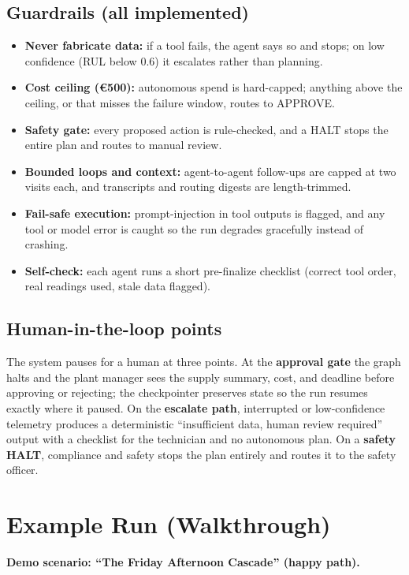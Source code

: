 \documentclass[11pt,a4paper]{article}
\let\oldsection\section
\renewcommand{\section}{\needspace{7\baselineskip}\oldsection}
\let\oldsubsection\subsection
\renewcommand{\subsection}{\needspace{5\baselineskip}\oldsubsection}
\begin{document}
\subsection*{Guardrails (all implemented)}
\begin{itemize}
  \item \textbf{Never fabricate data:} if a tool fails, the agent says so and stops; on low confidence (RUL below 0.6) it escalates rather than planning.
  \item \textbf{Cost ceiling (\euro{}500):} autonomous spend is hard-capped; anything above the ceiling, or that misses the failure window, routes to APPROVE.
  \item \textbf{Safety gate:} every proposed action is rule-checked, and a HALT stops the entire plan and routes to manual review.
  \item \textbf{Bounded loops and context:} agent-to-agent follow-ups are capped at two visits each, and transcripts and routing digests are length-trimmed.
  \item \textbf{Fail-safe execution:} prompt-injection in tool outputs is flagged, and any tool or model error is caught so the run degrades gracefully instead of crashing.
  \item \textbf{Self-check:} each agent runs a short pre-finalize checklist (correct tool order, real readings used, stale data flagged).
\end{itemize}

\subsection*{Human-in-the-loop points}
The system pauses for a human at three points. At the \textbf{approval gate} the graph halts and the plant manager sees the supply summary, cost, and deadline before approving or rejecting; the checkpointer preserves state so the run resumes exactly where it paused. On the \textbf{escalate path}, interrupted or low-confidence telemetry produces a deterministic ``insufficient data, human review required'' output with a checklist for the technician and no autonomous plan. On a \textbf{safety HALT}, compliance and safety stops the plan entirely and routes it to the safety officer.

\section{Example Run (Walkthrough)}
\textbf{Demo scenario: ``The Friday Afternoon Cascade'' (happy path).}
\end{document}

